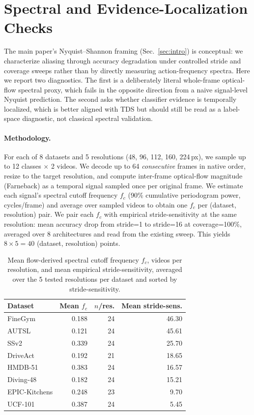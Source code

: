 \documentclass[runningheads]{llncs}
\newcommand{\tabtight}{\setlength{\tabcolsep}{3.5pt}\renewcommand{\arraystretch}{1.12}}
\newcommand{\TDS}{\textsc{TDS}}
\begin{document}
\section{Spectral and Evidence-Localization Checks}
\label{sec:sup_nyquist}

The main paper's Nyquist--Shannon framing (Sec.~\ref{sec:intro}) is conceptual: we characterize aliasing through accuracy degradation under controlled stride and coverage sweeps rather than by directly measuring action-frequency spectra. Here we report two diagnostics. The first is a deliberately literal whole-frame optical-flow spectral proxy, which fails in the opposite direction from a naive signal-level Nyquist prediction. The second asks whether classifier evidence is temporally localized, which is better aligned with \TDS{} but should still be read as a label-space diagnostic, not classical spectral validation.

\paragraph{Methodology.} For each of 8 datasets and 5 resolutions (48, 96, 112, 160, 224\,px), we sample up to 12 classes $\times$ 2 videos. We decode up to 64 \emph{consecutive} frames in native order, resize to the target resolution, and compute inter-frame optical-flow magnitude (Farneback) as a temporal signal sampled once per original frame. We estimate each signal's spectral cutoff frequency $f_c$ (90\% cumulative periodogram power, cycles/frame) and average over sampled videos to obtain one $f_c$ per (dataset, resolution) pair. We pair each $f_c$ with empirical stride-sensitivity at the same resolution: mean accuracy drop from stride=1 to stride=16 at coverage=100\%, averaged over 8 architectures and read from the existing sweep. This yields $8\times5=40$ (dataset, resolution) points.

\begin{table}[!htbp]
\centering
\caption{Mean flow-derived spectral cutoff frequency $f_c$, videos per resolution, and mean empirical stride-sensitivity, averaged over the 5 tested resolutions per dataset and sorted by stride-sensitivity.}
\label{tab:nyquist_v2}
\scriptsize\tabtight
\begin{tabular}{l r r r}
\toprule
Dataset & Mean $f_c$ & $n$/res. & Mean stride-sens. \\
\midrule
FineGym       & 0.188 & 24 & 46.30 \\
AUTSL         & 0.121 & 24 & 45.61 \\
SSv2          & 0.339 & 24 & 25.70 \\
DriveAct      & 0.192 & 21 & 18.65 \\
HMDB-51       & 0.383 & 24 & 16.57 \\
Diving-48     & 0.182 & 24 & 15.21 \\
EPIC-Kitchens & 0.248 & 23 &  9.70 \\
UCF-101       & 0.387 & 24 &  5.45 \\
\bottomrule
\end{tabular}
\end{table}
\end{document}
